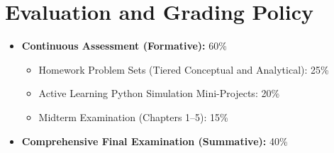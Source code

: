 \section*{Evaluation and Grading Policy}
\begin{itemize}
    \item \textbf{Continuous Assessment (Formative):} 60\%
    \begin{itemize}
        \item Homework Problem Sets (Tiered Conceptual and Analytical): 25\%
        \item Active Learning Python Simulation Mini-Projects: 20\%
        \item Midterm Examination (Chapters 1--5): 15\%
    \end{itemize}
    \item \textbf{Comprehensive Final Examination (Summative):} 40\%
\end{itemize}
